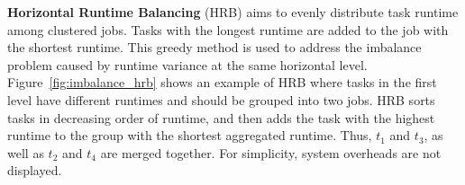 

\textbf{Horizontal Runtime Balancing} (HRB) aims to evenly distribute task runtime among clustered jobs. Tasks with the longest runtime are added to the job with the shortest runtime. This greedy method is used to address the imbalance problem caused by runtime variance at the same horizontal level. Figure~\ref{fig:imbalance_hrb} shows an example of HRB where tasks in the first level have different runtimes and should be grouped into two jobs. HRB sorts tasks in decreasing order of runtime, and then adds the task with the highest runtime to the group with the shortest aggregated runtime. Thus, $t_1$ and $t_3$, as well as $t_2$ and $t_4$ are merged together.
For simplicity, system overheads are not displayed.

